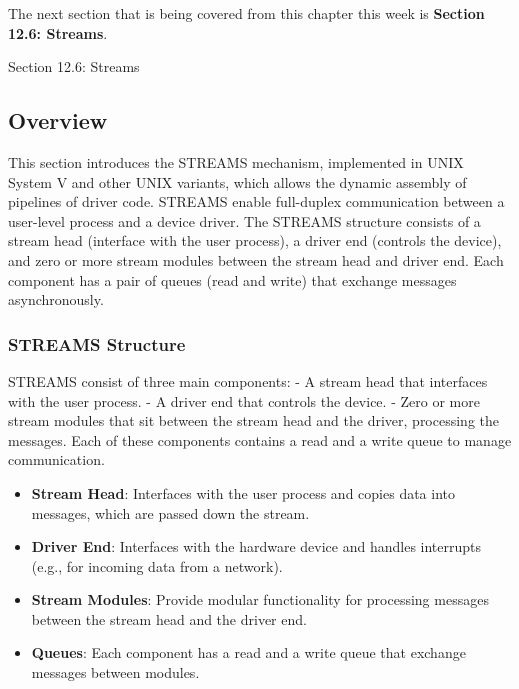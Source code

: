 The next section that is being covered from this chapter this week is \textbf{Section 12.6: Streams}.

\begin{notes}{Section 12.6: Streams}
    \subsection*{Overview}

    This section introduces the STREAMS mechanism, implemented in UNIX System V and other UNIX variants, which allows the dynamic assembly of pipelines of driver code. STREAMS enable full-duplex 
    communication between a user-level process and a device driver. The STREAMS structure consists of a stream head (interface with the user process), a driver end (controls the device), and zero or 
    more stream modules between the stream head and driver end. Each component has a pair of queues (read and write) that exchange messages asynchronously.
    
    \subsubsection*{STREAMS Structure}
    
    STREAMS consist of three main components:
    - A stream head that interfaces with the user process.
    - A driver end that controls the device.
    - Zero or more stream modules that sit between the stream head and the driver, processing the messages. Each of these components contains a read and a write queue to manage communication.
    
    \begin{highlight}
    
        \begin{itemize}
            \item \textbf{Stream Head}: Interfaces with the user process and copies data into messages, which are passed down the stream.
            \item \textbf{Driver End}: Interfaces with the hardware device and handles interrupts (e.g., for incoming data from a network).
            \item \textbf{Stream Modules}: Provide modular functionality for processing messages between the stream head and the driver end.
            \item \textbf{Queues}: Each component has a read and a write queue that exchange messages between modules.
        \end{itemize}
    

\end{highlight}
\end{notes}
